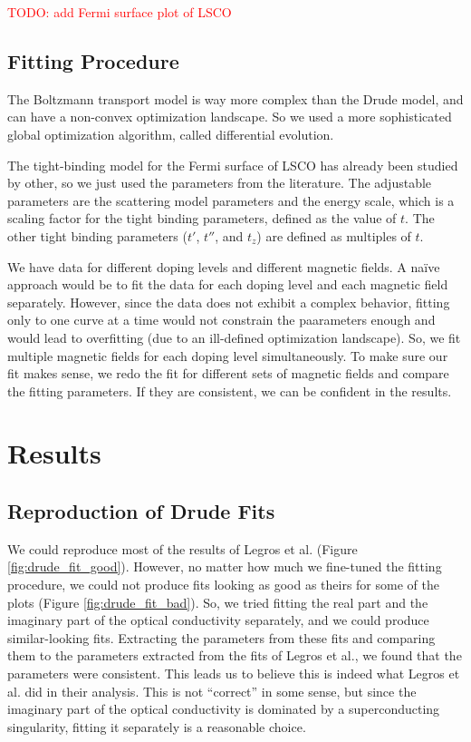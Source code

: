 \documentclass[12pt]{article}
\begin{document}
\textcolor{red}{TODO: add Fermi surface plot of LSCO}

\subsection{Fitting Procedure}
The Boltzmann transport model is way more complex than the Drude model, and can have a non-convex
optimization landscape. So we used a more sophisticated global optimization algorithm, called
differential evolution.

The tight-binding model for the Fermi surface of LSCO has already been studied by other, so we just
used the parameters from the literature. The adjustable parameters are the scattering model
parameters and the energy scale,  which is a scaling factor for the tight binding parameters,
defined as the value of $t$. The other tight binding parameters ($t'$, $t''$, and $t_z$) are defined
as multiples of $t$.

We have data for different doping levels and different magnetic fields. A naïve approach would be to
fit the data for each doping level and each magnetic field separately. However, since the data does
not exhibit a complex behavior, fitting only to one curve at a time would not constrain the
paarameters enough and would lead to overfitting (due to an ill-defined optimization landscape). So,
we fit multiple magnetic fields for each doping level simultaneously. To make sure our fit makes
sense, we redo the fit for different sets of magnetic fields and compare the fitting parameters.
If they are consistent, we can be confident in the results.

\section{Results}
\subsection{Reproduction of Drude Fits}
We could reproduce most of the results of Legros et al. (Figure \ref{fig:drude_fit_good}).
However, no matter how much we fine-tuned the fitting procedure, we could not produce fits looking
as good as theirs for some of the plots (Figure \ref{fig:drude_fit_bad}). So, we tried fitting the
real part and the imaginary part of the optical conductivity separately, and we could produce
similar-looking fits. Extracting the parameters from these fits and comparing them to the parameters
extracted from the fits of Legros et al., we found that the parameters were consistent. This leads
us to believe this is indeed what Legros et al. did in their analysis. This is not ``correct'' in
some sense, but since the imaginary part of the optical conductivity is dominated by a
superconducting singularity, fitting it separately is a reasonable choice.
\end{document}
